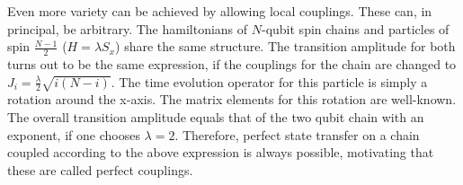 \begin{center}
\end{center}

\noindent Even more variety can be achieved by allowing local couplings. These can, in principal, be arbitrary. The hamiltonians of $N$-qubit spin chains and particles of spin $\frac{N-1}{2}$ ($H = \lambda S_x$) share the same structure. The transition amplitude for both turns out to be the same expression, if the couplings for the chain are changed to $J_i = \frac{\lambda}{2}\sqrt{i(N-i)}$\cite{Christandl2004}. The time evolution operator for this particle is simply a rotation around the x-axis. The matrix elements for this rotation are well-known\cite{FeynmanVol31965}. The overall transition amplitude equals that of the two qubit chain with an exponent, if one chooses $\lambda = 2$. Therefore, perfect state transfer on a chain coupled according to the above expression is always possible, motivating that these are called perfect couplings.

